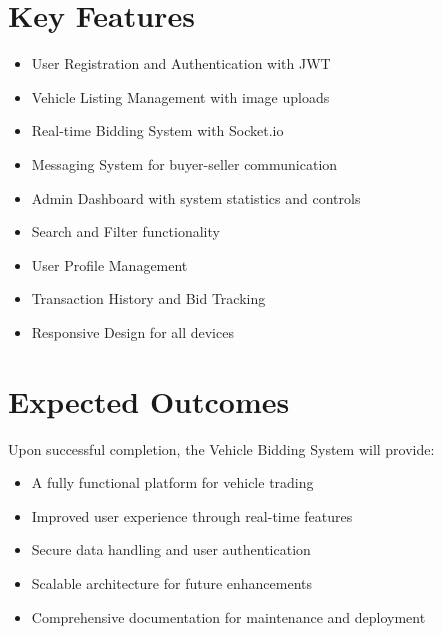 \section{Key Features}
\begin{itemize}
    \item User Registration and Authentication with JWT
    \item Vehicle Listing Management with image uploads
    \item Real-time Bidding System with Socket.io
    \item Messaging System for buyer-seller communication
    \item Admin Dashboard with system statistics and controls
    \item Search and Filter functionality
    \item User Profile Management
    \item Transaction History and Bid Tracking
    \item Responsive Design for all devices
\end{itemize}

\section{Expected Outcomes}
Upon successful completion, the Vehicle Bidding System will provide:
\begin{itemize}
    \item A fully functional platform for vehicle trading
    \item Improved user experience through real-time features
    \item Secure data handling and user authentication
    \item Scalable architecture for future enhancements
    \item Comprehensive documentation for maintenance and deployment
\end{itemize}


